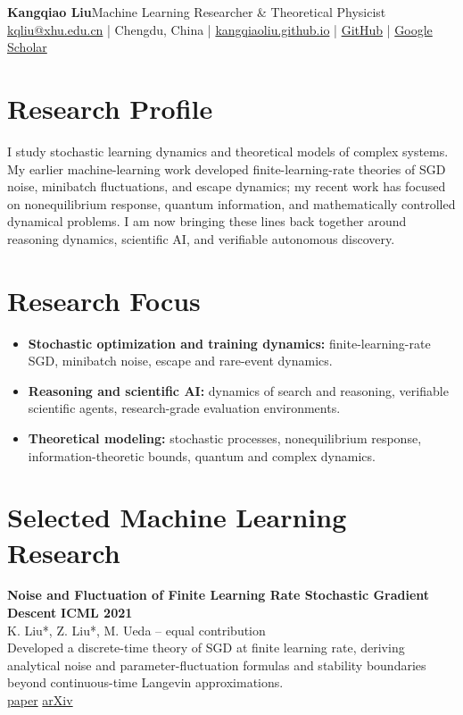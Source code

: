 \documentclass[10pt,a4paper]{article}
\newcommand{\where}[1]{\textcolor{muted}{#1}}
\newcommand{\link}[2]{\href{#1}{#2}}
\begin{document}
{\LARGE\bfseries Kangqiao Liu}\hfill \textcolor{muted}{Machine Learning Researcher \& Theoretical Physicist}\\[-1pt]
\small
\href{mailto:kqliu@xhu.edu.cn}{kqliu@xhu.edu.cn} \;|\; Chengdu, China \;|\;
\href{https://kangqiaoliu.github.io}{kangqiaoliu.github.io} \;|\;
\href{https://github.com/KangqiaoLiu}{GitHub} \;|\;
\href{https://scholar.google.com/citations?user=utIJkHcAAAAJ&hl=en}{Google Scholar}

\section*{Research Profile}
I study stochastic learning dynamics and theoretical models of complex systems. My earlier machine-learning work developed finite-learning-rate theories of SGD noise, minibatch fluctuations, and escape dynamics; my recent work has focused on nonequilibrium response, quantum information, and mathematically controlled dynamical problems. I am now bringing these lines back together around reasoning dynamics, scientific AI, and verifiable autonomous discovery.

\section*{Research Focus}
\begin{itemize}
  \item \textbf{Stochastic optimization and training dynamics:} finite-learning-rate SGD, minibatch noise, escape and rare-event dynamics.
  \item \textbf{Reasoning and scientific AI:} dynamics of search and reasoning, verifiable scientific agents, research-grade evaluation environments.
  \item \textbf{Theoretical modeling:} stochastic processes, nonequilibrium response, information-theoretic bounds, quantum and complex dynamics.
\end{itemize}

\section*{Selected Machine Learning Research}
\textbf{Noise and Fluctuation of Finite Learning Rate Stochastic Gradient Descent} \hfill \textbf{ICML 2021}\\
\where{K. Liu*, Z. Liu*, M. Ueda -- equal contribution}\\[-1pt]
Developed a discrete-time theory of SGD at finite learning rate, deriving analytical noise and parameter-fluctuation formulas and stability boundaries beyond continuous-time Langevin approximations.\\[-1pt]
\link{http://proceedings.mlr.press/v139/liu21ad.html}{paper} \;\; \link{https://arxiv.org/abs/2012.03636}{arXiv}
\end{document}
